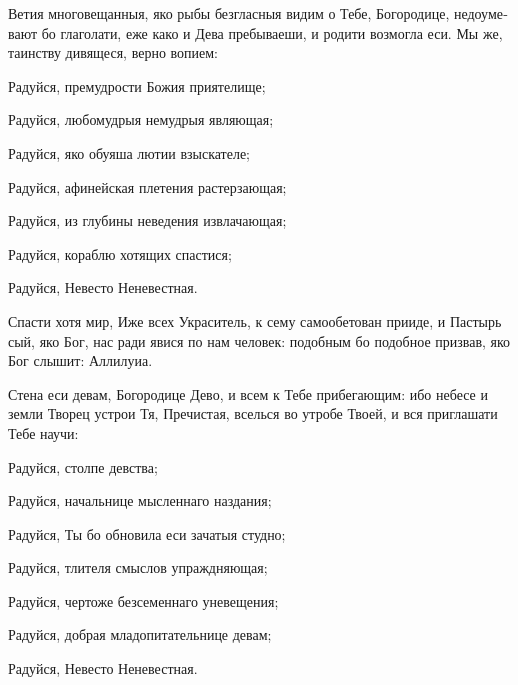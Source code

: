 \begin{russian}


  \Ierei Ветия многовещанныя, яко рыбы безгласныя видим о Тебе, Богородице, недоумевают бо глаголати, еже како и Дева пребываеши, и родити возмогла еси. Мы же, таинству дивящеся, верно вопием:

  Радуйся, премудрости Божия приятелище;


  Радуйся, любомудрыя немудрыя являющая;


  Радуйся, яко обуяша лютии взыскателе;


  Радуйся, афинейская плетения растерзающая;


  Радуйся, из глубины неведения извлачающая;


  Радуйся, кораблю хотящих спастися;


  Радуйся, Невесто Неневестная.


  \Ierei Спасти хотя мир, Иже всех Украситель, к сему самообетован прииде, и Пастырь сый, яко Бог, нас ради явися по нам человек: подобным бо подобное призвав, яко Бог слышит: Аллилуиа.


  \Ierei Стена еси девам, Богородице Дево, и всем к Тебе прибегающим: ибо небесе и земли Творец устрои Тя, Пречистая, вселься во утробе Твоей, и вся приглашати Тебе научи:

  Радуйся, столпе девства;


  Радуйся, начальнице мысленнаго наздания;


  Радуйся, Ты бо обновила еси зачатыя студно;


  Радуйся, тлителя смыслов упраждняющая;


  Радуйся, чертоже безсеменнаго уневещения;


  Радуйся, добрая младопитательнице девам;


  Радуйся, Невесто Неневестная.

\end{russian}

